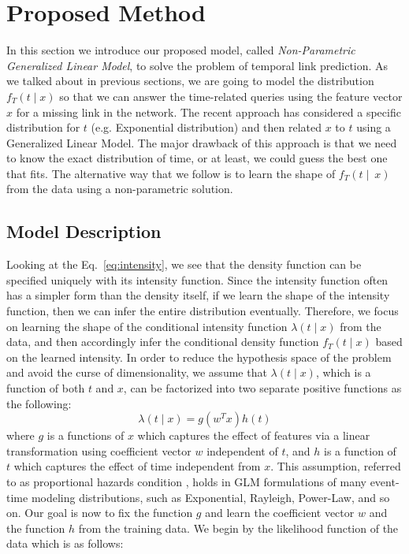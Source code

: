 \section{Proposed Method}\label{sec:method}
In this section we introduce our proposed model, called \emph{Non-Parametric Generalized Linear Model}, to solve the problem of temporal link prediction. As we talked about in previous sections, we are going to model the distribution $f_T(t\mid x)$ so that we can answer the time-related queries using the feature vector $x$ for a missing link in the network. The recent approach \cite{sun2012will} has considered a specific distribution for $t$ (e.g. Exponential distribution) and then related $x$ to $t$ using a Generalized Linear Model. The major drawback of this approach is that we need to know the exact distribution of time, or at least, we could guess the best one that fits. The alternative way that we follow is to learn the shape of $f_T(t\mid~x)$ from the data using a non-parametric solution.

\subsection{Model Description}
Looking at the Eq.~\ref{eq:intensity}, we see that the density function can be specified uniquely with its intensity function. Since the intensity function often has a simpler form than the density itself, if we learn the shape of the intensity function, then we can infer the entire distribution eventually. Therefore, we focus on learning the shape of the conditional intensity function $\lambda(t\mid x)$ from the data, and then accordingly infer the conditional density function $f_T(t\mid x)$ based on the learned intensity.
In order to reduce the hypothesis space of the problem and avoid the curse of dimensionality, we assume that $\lambda(t\mid x)$, which is a function of both $t$ and $x$, can be factorized into two separate positive functions as the following:
\begin{equation}\label{eq:lambda}
\lambda(t\mid x)=g(w^Tx)h(t)
\end{equation}
where $g$ is a functions of $x$ which captures the effect of features via a linear transformation using coefficient vector $w$ independent of $t$, and $h$ is a function of $t$ which captures the effect of time independent from $x$. This assumption, referred to as proportional hazards condition \cite{breslow1975analysis}, holds in GLM formulations of many event-time modeling distributions, such as Exponential, Rayleigh, Power-Law, and so on. Our goal is now to fix the function $g$ and learn the coefficient vector $w$ and the function $h$ from the training data. We begin by the likelihood function of the data which is as follows:

